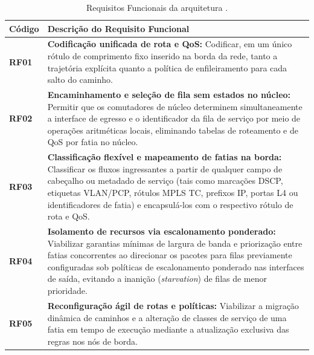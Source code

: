\begin{table}[htb]
    \centering
    \caption{Requisitos Funcionais da arquitetura \nome.}
    \label{tab:req_funcionais}
    \begin{tabular}{p{1.8cm} p{12.5cm}}
        \hline
        \textbf{Código} & \textbf{Descrição do Requisito Funcional} \\
        \hline
        \textbf{RF01} & \textbf{Codificação unificada de rota e QoS:} Codificar, em um único rótulo de comprimento fixo inserido na borda da rede, tanto a trajetória explícita quanto a política de enfileiramento para cada salto do caminho. \\
        \textbf{RF02} & \textbf{Encaminhamento e seleção de fila sem estados no núcleo:} Permitir que os comutadores de núcleo determinem simultaneamente a interface de egresso e o identificador da fila de serviço por meio de operações aritméticas locais, eliminando tabelas de roteamento e de QoS por fatia no núcleo. \\
        \textbf{RF03} & \textbf{Classificação flexível e mapeamento de fatias na borda:} Classificar os fluxos ingressantes a partir de qualquer campo de cabeçalho ou metadado de serviço (tais como marcações DSCP, etiquetas VLAN/PCP, rótulos MPLS TC, prefixos IP, portas L4 ou identificadores de fatia) e encapsulá-los com o respectivo rótulo de rota e QoS. \\
        \textbf{RF04} & \textbf{Isolamento de recursos via escalonamento ponderado:} Viabilizar garantias mínimas de largura de banda e priorização entre fatias concorrentes ao direcionar os pacotes para filas previamente configuradas sob políticas de escalonamento ponderado nas interfaces de saída, evitando a inanição (\textit{starvation}) de filas de menor prioridade. \\
        \textbf{RF05} & \textbf{Reconfiguração ágil de rotas e políticas:} Viabilizar a migração dinâmica de caminhos e a alteração de classes de serviço de uma fatia em tempo de execução mediante a atualização exclusiva das regras nos nós de borda. \\
        \hline
    \end{tabular}
\end{table}

